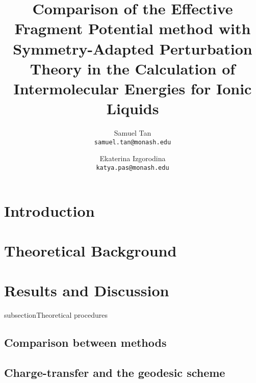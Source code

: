 \documentclass[final]{article}
\title{Comparison of the Effective Fragment Potential method with Symmetry-Adapted Perturbation Theory in the Calculation of Intermolecular Energies for Ionic Liquids}
\date{}
\author{Samuel Tan\\
        \texttt{samuel.tan@monash.edu} 
        \and
        Ekaterina Izgorodina\\
        \texttt{katya.pas@monash.edu}
}
\begin{document}
%
\clearpage

\maketitle
\begin{multicols}{2}

\section{Introduction}


\section{Theoretical Background}


\section{Results and Discussion}


subsection{Theoretical procedures}


\subsection{Comparison between methods}


\subsection{Charge-transfer and the geodesic scheme}


\end{multicols}
\end{document}
